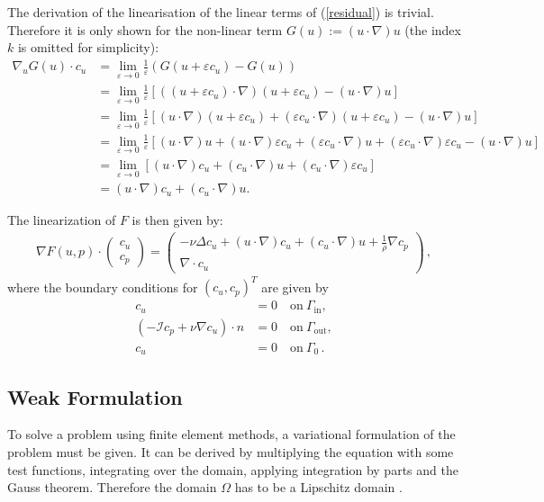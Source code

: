 \documentclass[a4paper, 11pt, twoside]{article}
\begin{document}
The derivation of the linearisation of the linear terms of (\ref{residual}) is trivial. Therefore it is only shown for the non-linear term $G(u):=(u\cdot \nabla)u$ (the index $k$ is omitted for simplicity):
\begin{align*}
\nabla_u G(u)\cdot c_u&=\underset{\varepsilon\rightarrow0}{\lim}\frac{1}{\varepsilon}(G(u+\varepsilon c_u)-G(u))\\
&=\underset{\varepsilon\rightarrow0}{\lim}\frac{1}{\varepsilon}\left[((u+\varepsilon c_u)\cdot \nabla)(u+\varepsilon c_u)-(u\cdot \nabla) u \right]\\
&=\underset{\varepsilon\rightarrow0}{\lim}\frac{1}{\varepsilon}\left[(u\cdot \nabla)(u+\varepsilon c_u)+(\varepsilon c_u \cdot \nabla)(u+\varepsilon c_u)-(u\cdot \nabla) u \right]\\
&=\underset{\varepsilon\rightarrow0}{\lim}\frac{1}{\varepsilon}\left[(u\cdot \nabla)u+(u\cdot \nabla)\varepsilon c_u+(\varepsilon c_u \cdot \nabla)u+(\varepsilon c_u\cdot \nabla)\varepsilon c_u-(u\cdot\nabla) u \right]\\
&=\underset{\varepsilon\rightarrow0}{\lim}\left[(u\cdot \nabla)c_u+(c_u\cdot \nabla)u+( c_u \cdot \nabla)\varepsilon c_u\right]\\
&=(u\cdot \nabla) c_u + (c_u\cdot \nabla)u  .
\end{align*}
 

The linearization of $F$ is then given by:
\begin{align*}
\nabla F(u,p)\cdot \begin{pmatrix}	c_u \\ c_p\end{pmatrix} = \begin{pmatrix}-\nu \Delta c_u + (u\cdot \nabla ) c_u +(c_u\cdot \nabla ) u+ \frac{1}{\rho} \nabla c_p \\ \nabla \cdot c_u \end{pmatrix}\, ,
\end{align*}
where the boundary conditions for $(c_u, c_p)^T$ are given by
\begin{equation*}
\begin{aligned}	
c_u &= 0 \quad \text{on} ~\Gamma_{\text{in}},\\
 (- \mathcal{I} c_p + \nu \nabla c_u) \cdot n &= 0 \quad \text{on} ~\Gamma_{\text{out}},\\ 	
 c_u &= 0 \quad \text{on} ~\Gamma_0\, .
\end{aligned}
\end{equation*}

\subsection{Weak Formulation}
To solve a problem using finite element methods, a variational formulation of the problem must be given. 
It can be derived by multiplying the equation with some test functions, integrating over the domain, applying integration by parts and the Gauss theorem. 
Therefore the domain $\Omega$ has to be a Lipschitz domain \cite[p.89-96]{mclean}.
\end{document}
